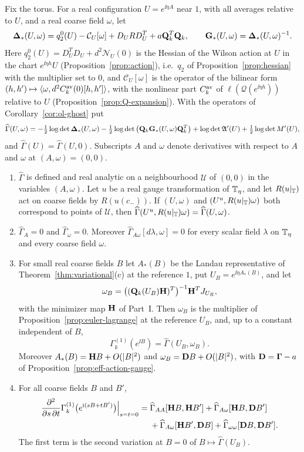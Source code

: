 \begin{lemma}\label{lem:ol-offshell}
Fix the torus. For a real configuration $U=e^{\ii\eta A}$ near $1$, with all averages relative to $U$, and a real coarse field $\omega$, let
\[
\boldsymbol{\Delta}_*(U,\omega)=q_2^0(U)-\mathcal C_U[\omega]+D_URD_U^T+a\mathbf Q_k^T\mathbf Q_k,\qquad\mathbf G_*(U,\omega)=\boldsymbol{\Delta}_*(U,\omega)^{-1}.
\]
Here $q_2^0(U)=D_U^TD_U+d^2\mathcal N_U(0)$ is the Hessian of the Wilson action at $U$ in the chart $e^{\ii\eta h}U$ (Proposition~\ref{prop:action}), i.e.\ $q_2$ of Proposition~\ref{prop:hessian} with the multiplier set to $0$, and $\mathcal C_U[\omega]$ is the operator of the bilinear form $(h,h')\mapsto\langle \omega,d^2C^{\rm av}_k(0)[h,h']\rangle$, with the nonlinear part $C^{\rm av}_k$ of $\ell(\mathcal Q(e^{\ii\eta h}))$ relative to $U$ (Proposition~\ref{prop:Q-expansion}). With the operators of Corollary~\ref{cor:ol-ghost} put
\[
\widehat\Gamma(U,\omega)=-\tfrac12\log\det\boldsymbol{\Delta}_*(U,\omega)-\tfrac12\log\det\big(\mathbf Q_k\mathbf G_*(U,\omega)\mathbf Q_k^T\big)+\log\det\mathfrak A'(U)+\tfrac12\log\det M'(U),
\]
and $\widehat\Gamma(U)=\widehat\Gamma(U,0)$. Subscripts $A$ and $\omega$ denote derivatives with respect to $A$ and $\omega$ at $(A,\omega)=(0,0)$.
\begin{enumerate}[label=(\alph*)]
\item $\widehat\Gamma$ is defined and real analytic on a neighbourhood $\mathcal U$ of $(0,0)$ in the variables $(A,\omega)$. Let $u$ be a real gauge transformation of $\mathbb T_\eta$, and let $R(u|_\mathbb T)$ act on coarse fields by $R(u(c_-))$. If $(U,\omega)$ and $(U^u,R(u|_\mathbb T)\omega)$ both correspond to points of $\mathcal U$, then $\widehat\Gamma(U^u,R(u|_\mathbb T)\omega)=\widehat\Gamma(U,\omega)$.
\item $\widehat\Gamma_A=0$ and $\widehat\Gamma_\omega=0$. Moreover $\widehat\Gamma_{A\omega}[d\lambda,\omega]=0$ for every scalar field $\lambda$ on $\mathbb T_\eta$ and every coarse field $\omega$.
\item For small real coarse fields $B$ let $A_*(B)$ be the Landau representative of Theorem~\ref{thm:variational}(c) at the reference $1$, put $U_B=e^{\ii\eta A_*(B)}$, and let
\[
\omega_B=\big((\mathbf Q_k(U_B)\mathbf H)^T\big)^{-1}\mathbf H^TJ_{U_B},
\]
with the minimizer map $\mathbf H$ of Part~I. Then $\omega_B$ is the multiplier of Proposition~\ref{prop:euler-lagrange} at the reference $U_B$, and, up to a constant independent of $B$,
\[
\Gamma^{(1)}_k(e^{\ii B})=\widehat\Gamma(U_B,\omega_B).
\]
Moreover $A_*(B)=\mathbf H B+O(|B|^2)$ and $\omega_B=\mathbf D B+O(|B|^2)$, with $\mathbf D=\boldsymbol\Gamma-a$ of Proposition~\ref{prop:eff-action-gauge}.
\item For all coarse fields $B$ and $B'$,
\[
\begin{aligned}
\frac{\partial^2}{\partial s\,\partial t}\Gamma^{(1)}_k\big(e^{\mathrm i(sB+tB')}\big)\Big|_{s=t=0}={}&\widehat\Gamma_{AA}[\mathbf H B,\mathbf H B']+\widehat\Gamma_{A\omega}[\mathbf H B,\mathbf D B']\\
&+\widehat\Gamma_{A\omega}[\mathbf H B',\mathbf D B]+\widehat\Gamma_{\omega\omega}[\mathbf D B,\mathbf D B'] .
\end{aligned}
\]
The first term is the second variation at $B=0$ of $B\mapsto\widehat\Gamma(U_B)$.
\end{enumerate}
\end{lemma}

